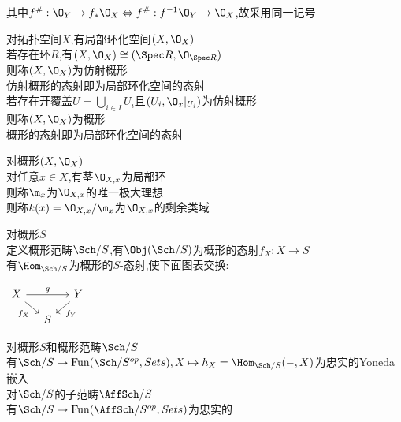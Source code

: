 \begin{dingyi}
其中$f^{\#}:\O_{Y}\to f_{*}\O_{X}\Leftrightarrow f^{\#}:f^{-1}\O_{Y}\to \O_{X}$,故采用同一记号
\end{dingyi}

\begin{dingyi}
对拓扑空间$X$,有局部环化空间$(X,\O_{X})$\\
若存在环$R$,有$(X,\O_{X})\cong (\Spec R,\O_{\Spec R})$\\
则称$(X,\O_{X})$为仿射概形\\
仿射概形的态射即为局部环化空间的态射\\
若存在开覆盖$U=\bigcup_{i\in I}U_i$且$(U_i,\O_{x}|_{U_i})$为仿射概形\\
则称$(X,\O_{X})$为概形\\
概形的态射即为局部环化空间的态射
\end{dingyi}

\begin{dingyi}
对概形$(X,\O_{X})$\\
对任意$x\in X$,有茎$\O_{X,x}$为局部环\\
则称$\m_{x}$为$\O_{X,x}$的唯一极大理想\\
则称$k(x)=\O_{X,x}/\m_{x}$为$\O_{X,x}$的剩余类域
\end{dingyi}

\begin{dingyi}
对概形$S$\\
定义概形范畴$\Sch/S$,有$\Obj(\Sch/S)$为概形的态射$f_{X}:X\to S$\\
有$\Hom_{\Sch/S}$为概形的$S$-态射,使下面图表交换:
\begin{center}
    $\begin{tikzcd}[column sep=small, row sep=small]
    X \ar[rr,"g"] \ar[dr,"f_{X}"'] & & Y \ar[dl,"f_{Y}"]\\ 
    & S &
    \end{tikzcd}$
\end{center}
\end{dingyi}

\begin{dingli}
对概形$S$和概形范畴$\Sch/S$\\
有$\Sch/S\to \mathrm{Fun}(\Sch/S^{op},Sets),X\mapsto h_{X}=\Hom_{\Sch/S}(-,X)$为忠实的Yoneda嵌入\\
对$\Sch/S$的子范畴$\AffSch/S$\\
有$\Sch/S\to \mathrm{Fun}(\AffSch/S^{op},Sets)$为忠实的
\end{dingli}


